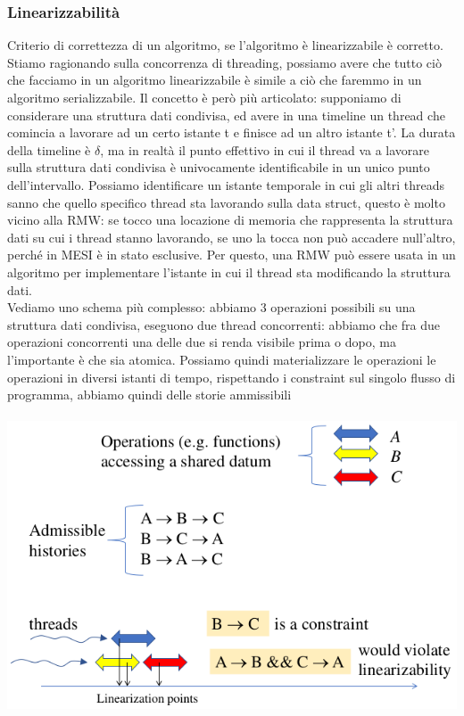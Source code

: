 \documentclass[12pt, oneside]{extbook}
\begin{document}
\subsubsection{Linearizzabilità}
Criterio di correttezza di un algoritmo, se l'algoritmo è linearizzabile è corretto. Stiamo ragionando sulla concorrenza di threading, possiamo avere che tutto ciò che facciamo in un algoritmo linearizzabile è simile a ciò che faremmo in un algoritmo serializzabile. Il concetto è però più articolato: supponiamo di considerare una struttura dati condivisa, ed avere in una timeline un thread che comincia a lavorare ad un certo istante t e finisce ad un altro istante t'. La durata della timeline è $\delta$, ma in realtà il punto effettivo in cui il thread va a lavorare sulla struttura dati condivisa è univocamente identificabile in un unico punto dell'intervallo. Possiamo identificare un istante temporale in cui gli altri threads sanno che quello specifico thread sta lavorando sulla data struct, questo è molto vicino alla RMW: se tocco una locazione di memoria che rappresenta la struttura dati su cui i thread stanno lavorando, se uno la tocca non può accadere null'altro, perché in MESI è in stato esclusive. Per questo, una RMW può essere usata in un algoritmo per implementare l'istante in cui il thread sta modificando la struttura dati.\\ Vediamo uno schema più complesso: abbiamo 3 operazioni possibili su una struttura dati condivisa, eseguono due thread concorrenti: abbiamo che fra due operazioni concorrenti una delle due si renda visibile prima o dopo, ma l'importante è che sia atomica. Possiamo quindi materializzare le operazioni le operazioni in diversi istanti di tempo, rispettando i constraint sul singolo flusso di programma, abbiamo quindi delle storie ammissibili\\\\
\includegraphics[scale=0.6]{immagini/wct.png}\\\\
\end{document}
